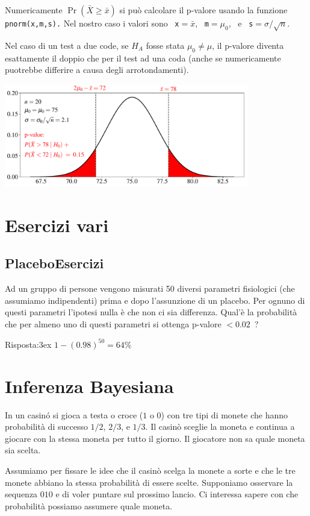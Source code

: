 \documentclass[12pt,openany]{book}
\theoremstyle{mio}
\theoremstyle{liscio}
\begin{document}
Numericamente $\Pr(\bar X\ge \bar x)$ si può calcolare il p-valore usando la funzione {\tt pnorm(x,m,s).} Nel nostro caso i valori sono \ {\tt x}$=\bar x$,  \ {\tt m}$=\mu_0$, \ e  \ {\tt s}$=\sigma/\sqrt{n}$.

Nel caso di un test a due code, se $H_A$ fosse stata $\mu_0\neq\mu$, il p-valore diventa esattamente il doppio che per il test ad una coda (anche se numericamente puotrebbe differire a causa degli arrotondamenti). 

\hfil\includegraphics[width=0.8\textwidth]{figure/Z-test-p-val_02.pdf}


\clearpage\section{Esercizi vari}
\subsection{Placebo\hfill Esercizi}


Ad un gruppo di persone vengono misurati 50 diversi parametri fisiologici (che assumiamo indipendenti) prima e dopo l'assunzione di un placebo. Per ognuno di questi parametri l'ipotesi nulla è che non ci sia differenza. Qual'è la probabilità che per almeno uno di questi parametri si ottenga p-valore $<0.02$~?


Risposta:\kern3ex $1-(0.98)^{50}=64\%$


\section{Inferenza Bayesiana}

In un casinó si gioca a testa o croce ($1$ o $0$) con tre tipi di monete che hanno probabilità di successo $1/2$, $2/3$, e $1/3$. Il casinò sceglie la moneta e continua a giocare con la stessa moneta per tutto il giorno. Il giocatore non sa quale moneta sia scelta.

Assumiamo per fissare le idee che il casinò scelga la monete a sorte e che le tre monete abbiano la stessa probabilità di essere scelte. Supponiamo osservare la sequenza $010$ e di voler puntare sul prossimo lancio. Ci interessa sapere con che probabilità possiamo assumere quale moneta.  
\end{document}
